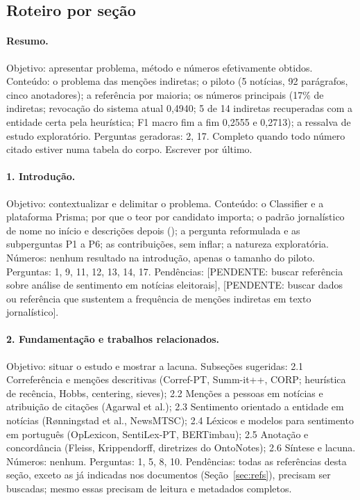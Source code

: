 \documentclass[11pt,a4paper]{article}
\newcommand{\pend}[1]{\textcolor{red!60!black}{[PENDENTE: #1]}}
\begin{document}
\subsection{Roteiro por seção}

\paragraph{Resumo.}
Objetivo: apresentar problema, método e números efetivamente obtidos. Conteúdo: o problema das menções indiretas; o piloto (5 notícias, 92 parágrafos, cinco anotadores); a referência por maioria; os números principais (17\% de indiretas; revocação do sistema atual 0,4940; 5 de 14 indiretas recuperadas com a entidade certa pela heurística; F1 macro fim a fim 0,2555 e 0,2713); a ressalva de estudo exploratório. Perguntas geradoras: 2, 17. Completo quando todo número citado estiver numa tabela do corpo. Escrever por último.

\paragraph{1. Introdução.}
Objetivo: contextualizar e delimitar o problema. Conteúdo: o Classifier e a plataforma Prisma; por que o teor por candidato importa; o padrão jornalístico de nome no início e descrições depois (); a pergunta reformulada e as subperguntas P1 a P6; as contribuições, sem inflar; a natureza exploratória. Números: nenhum resultado na introdução, apenas o tamanho do piloto. Perguntas: 1, 9, 11, 12, 13, 14, 17. Pendências: \pend{buscar referência sobre análise de sentimento em notícias eleitorais}, \pend{buscar dados ou referência que sustentem a frequência de menções indiretas em texto jornalístico}.

\paragraph{2. Fundamentação e trabalhos relacionados.}
Objetivo: situar o estudo e mostrar a lacuna. Subseções sugeridas: 2.1 Correferência e menções descritivas (Corref-PT, Summ-it++, CORP; heurística de recência, Hobbs, centering, sieves); 2.2 Menções a pessoas em notícias e atribuição de citações (Agarwal et al.); 2.3 Sentimento orientado a entidade em notícias (Rønningstad et al., NewsMTSC); 2.4 Léxicos e modelos para sentimento em português (OpLexicon, SentiLex-PT, BERTimbau); 2.5 Anotação e concordância (Fleiss, Krippendorff, diretrizes do OntoNotes); 2.6 Síntese e lacuna. Números: nenhum. Perguntas: 1, 5, 8, 10. Pendências: todas as referências desta seção, exceto as já indicadas nos documentos (Seção~\ref{sec:refs}), precisam ser buscadas; mesmo essas precisam de leitura e metadados completos.
\end{document}
